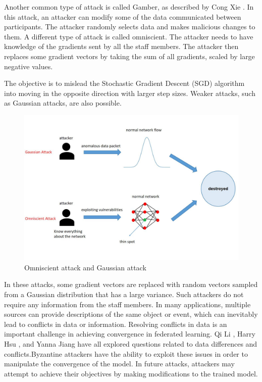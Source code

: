\documentclass[conference]{IEEEtran}
\begin{document}
Another common type of attack is called Gamber, as described by Cong Xie \cite{b121}.
In this attack, an attacker can modify some of the data communicated between participants.
The attacker randomly selects data and makes malicious changes to them.
A different type of attack is called omniscient.
The attacker needs to have knowledge of the gradients sent by all the staff members.
The attacker then replaces some gradient vectors by taking the sum of all gradients, scaled by large negative values.

The objective is to mislead the Stochastic Gradient Descent (SGD) algorithm into moving in the opposite direction with larger step sizes.
Weaker attacks, such as Gaussian attacks, are also possible.

\begin{figure}[htbp]
    \centerline{\includegraphics[width=0.8\linewidth,height=0.6\linewidth]{picture/gause.jpg}}
    \caption{Omniscient attack and Gaussian attack}
    \label{fig14}
\end{figure}

In these attacks, some gradient vectors are replaced with random vectors sampled from a Gaussian distribution that has a large variance.
Such attackers do not require any information from the staff members.
In many applications, multiple sources can provide descriptions of the same object or event, which can inevitably
lead to conflicts in data or information. Resolving conflicts in data is an important challenge in
achieving convergence in federated learning. Qi Li \cite{b122}, Harry Hsu \cite{b123}, and Yanna Jiang \cite{b124} have all
explored questions related to data differences and conflicts.Byzantine attackers have the ability to exploit these
issues in order to manipulate the convergence of the model.
In future attacks, attackers may attempt to achieve their objectives by making modifications to the trained model.
\end{document}
